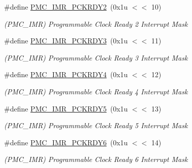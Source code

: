 \begin{DoxyCompactItemize}
\mbox{\label{group__SAMS70__PMC_ga900f4f1c6b07e3713ce4a4935eea5fee}} 
\#define \mbox{\hyperlink{group__SAMS70__PMC_ga900f4f1c6b07e3713ce4a4935eea5fee}{P\+M\+C\+\_\+\+I\+M\+R\+\_\+\+P\+C\+K\+R\+D\+Y2}}~(0x1u $<$$<$ 10)
\begin{DoxyCompactList}\small\item\em (P\+M\+C\+\_\+\+I\+MR) Programmable Clock Ready 2 Interrupt Mask \end{DoxyCompactList}\item 
\mbox{\label{group__SAMS70__PMC_gaaeeb62343adc85408c5d94b90934b297}} 
\#define \mbox{\hyperlink{group__SAMS70__PMC_gaaeeb62343adc85408c5d94b90934b297}{P\+M\+C\+\_\+\+I\+M\+R\+\_\+\+P\+C\+K\+R\+D\+Y3}}~(0x1u $<$$<$ 11)
\begin{DoxyCompactList}\small\item\em (P\+M\+C\+\_\+\+I\+MR) Programmable Clock Ready 3 Interrupt Mask \end{DoxyCompactList}\item 
\mbox{\label{group__SAMS70__PMC_ga0223426b2d009e27a00a9da99dfa5670}} 
\#define \mbox{\hyperlink{group__SAMS70__PMC_ga0223426b2d009e27a00a9da99dfa5670}{P\+M\+C\+\_\+\+I\+M\+R\+\_\+\+P\+C\+K\+R\+D\+Y4}}~(0x1u $<$$<$ 12)
\begin{DoxyCompactList}\small\item\em (P\+M\+C\+\_\+\+I\+MR) Programmable Clock Ready 4 Interrupt Mask \end{DoxyCompactList}\item 
\mbox{\label{group__SAMS70__PMC_gac8dd9beb3bea0c92044df7cd1ace2e8a}} 
\#define \mbox{\hyperlink{group__SAMS70__PMC_gac8dd9beb3bea0c92044df7cd1ace2e8a}{P\+M\+C\+\_\+\+I\+M\+R\+\_\+\+P\+C\+K\+R\+D\+Y5}}~(0x1u $<$$<$ 13)
\begin{DoxyCompactList}\small\item\em (P\+M\+C\+\_\+\+I\+MR) Programmable Clock Ready 5 Interrupt Mask \end{DoxyCompactList}\item 
\mbox{\label{group__SAMS70__PMC_gac043064df5f0c7977b0a99b34b1a186a}} 
\#define \mbox{\hyperlink{group__SAMS70__PMC_gac043064df5f0c7977b0a99b34b1a186a}{P\+M\+C\+\_\+\+I\+M\+R\+\_\+\+P\+C\+K\+R\+D\+Y6}}~(0x1u $<$$<$ 14)
\begin{DoxyCompactList}\small\item\em (P\+M\+C\+\_\+\+I\+MR) Programmable Clock Ready 6 Interrupt Mask \end{DoxyCompactList}\item 
$$
\end{DoxyCompactItemize}
